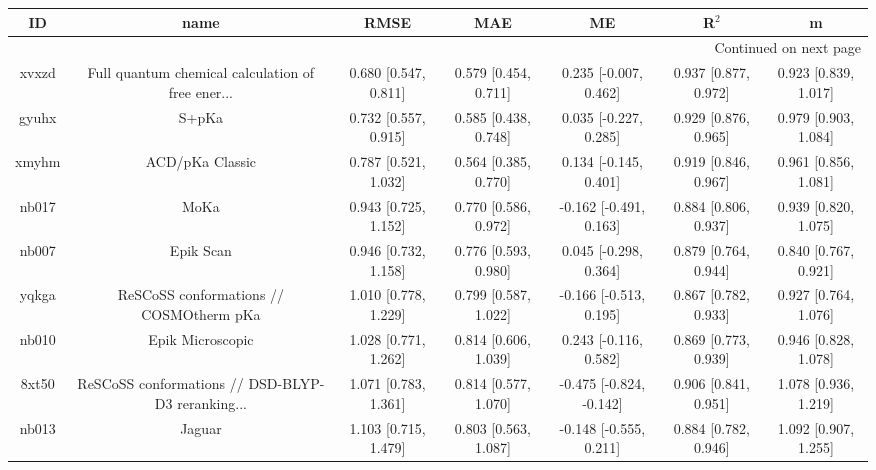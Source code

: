 \documentclass{article}
\begin{document}
\begin{center}
\begin{longtable}{|ccccccc|}
\toprule
    ID &                                               name &                  RMSE &                   MAE &                       ME &                 R$^2$ &                      m \\
\midrule
\endhead
\midrule
\multicolumn{7}{r}{{Continued on next page}} \\
\midrule
\endfoot

\bottomrule
\endlastfoot
 xvxzd &  Full quantum chemical calculation of free ener... &  0.680 [0.547, 0.811] &  0.579 [0.454, 0.711] &    0.235 [-0.007, 0.462] &  0.937 [0.877, 0.972] &   0.923 [0.839, 1.017] \\
 gyuhx &                                              S+pKa &  0.732 [0.557, 0.915] &  0.585 [0.438, 0.748] &    0.035 [-0.227, 0.285] &  0.929 [0.876, 0.965] &   0.979 [0.903, 1.084] \\
 xmyhm &                                    ACD/pKa Classic &  0.787 [0.521, 1.032] &  0.564 [0.385, 0.770] &    0.134 [-0.145, 0.401] &  0.919 [0.846, 0.967] &   0.961 [0.856, 1.081] \\
 nb017 &                                               MoKa &  0.943 [0.725, 1.152] &  0.770 [0.586, 0.972] &   -0.162 [-0.491, 0.163] &  0.884 [0.806, 0.937] &   0.939 [0.820, 1.075] \\
 nb007 &                                          Epik Scan &  0.946 [0.732, 1.158] &  0.776 [0.593, 0.980] &    0.045 [-0.298, 0.364] &  0.879 [0.764, 0.944] &   0.840 [0.767, 0.921] \\
 yqkga &            ReSCoSS conformations // COSMOtherm pKa &  1.010 [0.778, 1.229] &  0.799 [0.587, 1.022] &   -0.166 [-0.513, 0.195] &  0.867 [0.782, 0.933] &   0.927 [0.764, 1.076] \\
 nb010 &                                   Epik Microscopic &  1.028 [0.771, 1.262] &  0.814 [0.606, 1.039] &    0.243 [-0.116, 0.582] &  0.869 [0.773, 0.939] &   0.946 [0.828, 1.078] \\
 8xt50 &  ReSCoSS conformations // DSD-BLYP-D3 reranking... &  1.071 [0.783, 1.361] &  0.814 [0.577, 1.070] &  -0.475 [-0.824, -0.142] &  0.906 [0.841, 0.951] &   1.078 [0.936, 1.219] \\
 nb013 &                                             Jaguar &  1.103 [0.715, 1.479] &  0.803 [0.563, 1.087] &   -0.148 [-0.555, 0.211] &  0.884 [0.782, 0.946] &   1.092 [0.907, 1.255] \\

\end{longtable}
\end{center}
\end{document}
